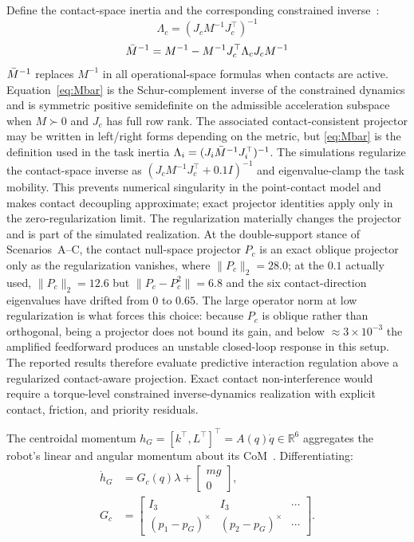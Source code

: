 Define the contact-space inertia and the corresponding constrained
inverse~\cite{khatib1987unified,righetti2011inverse}:
\begin{equation}\label{eq:Pc}
  \Lambda_c=(J_cM^{-1}J_c^\top)^{-1}
\end{equation}
\begin{equation}\label{eq:Mbar}
  \bar{M}^{-1} = M^{-1}-M^{-1}J_c^\top\Lambda_cJ_cM^{-1}
\end{equation}
$\bar{M}^{-1}$ replaces $M^{-1}$ in all operational-space formulas when contacts
are active. Equation~\eqref{eq:Mbar} is the Schur-complement inverse of the
constrained dynamics and is symmetric positive semidefinite on the admissible
acceleration subspace when $M\succ0$ and $J_c$ has full row rank. The
associated contact-consistent projector may be written in left/right forms
depending on the metric, but \eqref{eq:Mbar} is the definition used in the
task inertia $\Lambda_i=(J_i\bar{M}^{-1} J_i^\top)^{-1}$.
The simulations regularize the contact-space inverse as
$(J_cM^{-1}J_c^\top+0.1I)^{-1}$ and eigenvalue-clamp the task mobility.
This prevents numerical singularity in the point-contact model and makes
contact decoupling approximate; exact projector identities apply only in the
zero-regularization limit. The regularization materially changes the projector
and is part of the simulated realization.
At the double-support stance of Scenarios~A--C, the contact null-space
projector $P_c$ is an exact oblique projector only as the regularization
vanishes, where $\|P_c\|_2=28.0$; at the $0.1$ actually used,
$\|P_c\|_2=12.6$ but $\|P_c-P_c^2\|=6.8$ and the six contact-direction
eigenvalues have drifted from $0$ to $0.65$. The large operator norm at low
regularization is what forces this choice: because $P_c$ is oblique rather
than orthogonal, being a projector does not bound its gain, and below
${\approx}3\times10^{-3}$ the amplified feedforward produces an unstable
closed-loop response in this setup. The reported results therefore evaluate
predictive interaction regulation above a regularized contact-aware
projection. Exact contact non-interference would require a torque-level
constrained inverse-dynamics realization with explicit contact, friction, and
priority residuals.

The centroidal momentum $h_G=[k^\top,L^\top]^\top=A(q)\dot{q}\in\mathbb{R}^6$
aggregates the robot's linear and angular momentum about its
CoM~\cite{orin2013centroidal}. Differentiating:
\begin{equation}\label{eq:centroidal}
\begin{aligned}
  \dot{h}_G &= G_c(q)\lambda + \begin{bmatrix}mg \\ 0\end{bmatrix},\\
  G_c &= \begin{bmatrix}I_3 & I_3 & \cdots \\
          (p_1{-}p_G)^\times & (p_2{-}p_G)^\times & \cdots\end{bmatrix}.
\end{aligned}
\end{equation}

